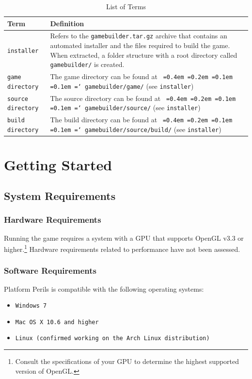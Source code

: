 \documentclass[12pt, titlepage]{article}
\newcommand*\justify{%
  \fontdimen2\font=0.4em%
  \fontdimen3\font=0.2em%
  \fontdimen4\font=0.1em%
  \fontdimen7\font=0.1em%
  \hyphenchar\font=`\-%
}
\begin{document}
\begin{table}[H]
\caption{List of Terms} \label{tab:terminology}
\renewcommand{\arraystretch}{1.2}
\begin{tabularx}{\textwidth}{p{4cm}X}
\toprule {\bf Term} & {\bf Definition}\\
\midrule
\texttt{installer} & Refers to the \texttt{gamebuilder.tar.gz} archive that contains an automated installer and the files required to build the game.  When extracted, a folder structure with a root directory called \texttt{gamebuilder/} is created.\\
\texttt{game directory} & The game directory can be found at \texttt{\justify gamebuilder/game/} (see \texttt{installer}) \\
\texttt{source directory} & The source directory can be found at \texttt{\justify gamebuilder/source/} (see \texttt{installer}) \\
\texttt{build directory} & The build directory can be found at \texttt{\justify gamebuilder/source/build/} (see \texttt{installer}) \\
\bottomrule
\end{tabularx}
\end{table}
\section{Getting Started}
\label{sec:gettingstarted}
\subsection{System Requirements}
\subsubsection{Hardware Requirements}
Running the game requires a system with a GPU that supports OpenGL v3.3 or higher.\footnote{Consult the specifications of your GPU to determine the highest supported version of OpenGL.}  Hardware requirements related to performance have not been assessed.
\subsubsection{Software Requirements}

Platform Perils is compatible with the following operating systems:
\begin{itemize}
  \item \texttt{Windows 7}
  \item \texttt{Mac OS X 10.6 and higher}
  \item \texttt{Linux (confirmed working on the Arch Linux distribution)}
\end{itemize}
\end{document}
